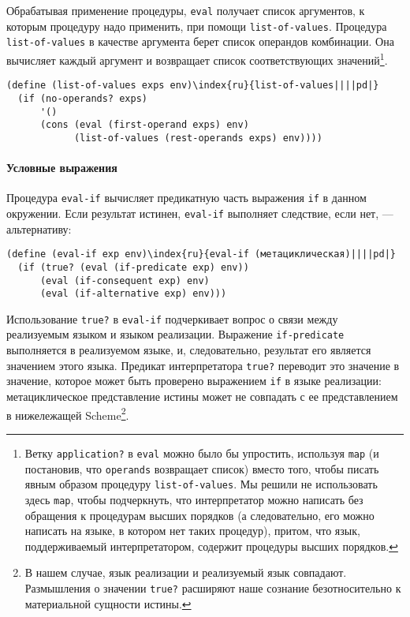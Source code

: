 Обрабатывая применение процедуры, {\tt eval} 
получает список аргументов, к которым процедуру надо
применить, при помощи {\tt list-of-values}.  Процедура
{\tt list-of-values} в качестве аргумента берет список
операндов комбинации.  Она вычисляет каждый аргумент и возвращает
список соответствующих значений\footnote{Ветку {\tt application?} в {\tt eval}
можно было бы упростить, используя {\tt map} (и постановив, что
{\tt operands} возвращает список) вместо того, чтобы писать
явным образом процедуру {\tt list-of-values}.  Мы решили не
использовать здесь {\tt map}, чтобы подчеркнуть, что 
интерпретатор можно написать без обращения к процедурам высших
порядков (а следовательно, его можно написать на языке, в котором нет
таких процедур), притом, что язык, поддерживаемый интерпретатором, содержит
процедуры высших порядков.}.

\begin{Verbatim}[fontsize=\small]
(define (list-of-values exps env)\index{ru}{list-of-values||||pd|}
  (if (no-operands? exps)
      '()
      (cons (eval (first-operand exps) env)
            (list-of-values (rest-operands exps) env))))
\end{Verbatim}

\paragraph{Условные выражения}

Процедура {\tt eval-if} вычисляет предикатную
часть выражения {\tt if} в данном окружении.  Если результат
истинен, {\tt eval-if} выполняет следствие, если нет, ---
альтернативу:

\begin{Verbatim}[fontsize=\small]
(define (eval-if exp env)\index{ru}{eval-if (метациклическая)||||pd|}
  (if (true? (eval (if-predicate exp) env))
      (eval (if-consequent exp) env)
      (eval (if-alternative exp) env)))
\end{Verbatim}

Использование {\tt true?} в {\tt eval-if}
подчеркивает вопрос о связи между 
реализуемым языком и языком
реализации. Выражение {\tt if-predicate} выполняется в
реализуемом языке, и, следовательно, результат его является значением
этого языка.  Предикат интерпретатора {\tt true?} переводит это
значение в значение, которое может быть проверено выражением
{\tt if} в языке реализации: метациклическое представление
истины может не совпадать с ее представлением в нижележащей Scheme\footnote{В 
нашем случае, язык реализации и реализуемый язык
совпадают.  Размышления о значении {\tt true?} расширяют наше сознание 
безотносительно к материальной сущности истины.}.

